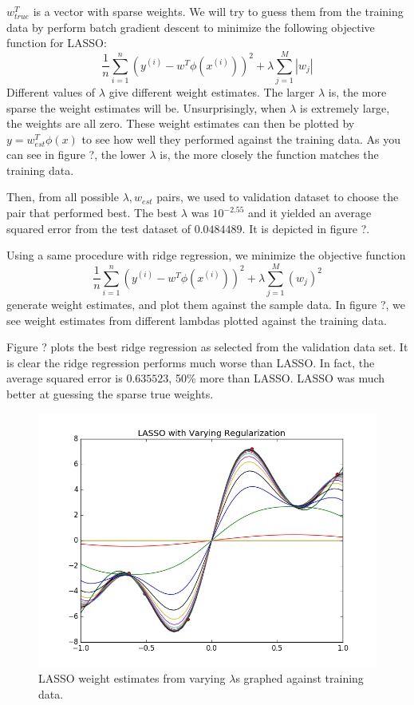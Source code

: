 \documentclass[a4paper,twoside]{article}
\begin{document}
$w_{true}^T$ is a vector with sparse weights. We will try to guess them from the training data by perform batch gradient descent to minimize the following objective function for LASSO:
\begin{equation}
\frac{1}{n} \sum_{i=1}^{n} (y^{(i)} - w^T \phi(x^{(i)}))^2 + \lambda \sum_{j=1}^{M} |w_j|
\end{equation}
Different values of $\lambda$ give different weight estimates. The larger $\lambda$ is, the more sparse the weight estimates will be. Unsurprisingly, when $\lambda$ is extremely large, the weights are all zero. These weight estimates can then be plotted by $y = w_{est}^T \phi (x)$ to see how well they performed against the training data. As you can see in figure ?, the lower $\lambda$ is, the more closely the function matches the training data.


Then, from all possible $\lambda, w_{est}$ pairs, we used to validation dataset to choose the pair that performed best. The best $\lambda$ was $10^{-2.55}$ and it yielded an average squared error from the test dataset of $0.0484489$. It is depicted in figure ?.


Using a same procedure with ridge regression, we minimize the objective function
\begin{equation}
\frac{1}{n} \sum_{i=1}^{n} (y^{(i)} - w^T \phi(x^{(i)}))^2 + \lambda \sum_{j=1}^{M} (w_j)^2
\end{equation}
generate weight estimates, and plot them against the sample data. In figure ?, we see weight estimates from different lambdas plotted against the training data.


Figure ? plots the best ridge regression as selected from the validation data set. It is clear the ridge regression performs much worse than LASSO. In fact, the average squared error is $0.635523$, 50\% more than LASSO. LASSO was much better at guessing the sparse true weights.




\begin{figure}[b!]
  \includegraphics[width=\linewidth]{../Figures/P4/lasso_varying.png}
  \caption{LASSO weight estimates from varying $\lambda$s graphed against training data.}
  \label{fig:lasso_varying}
\end{figure}
\end{document}
